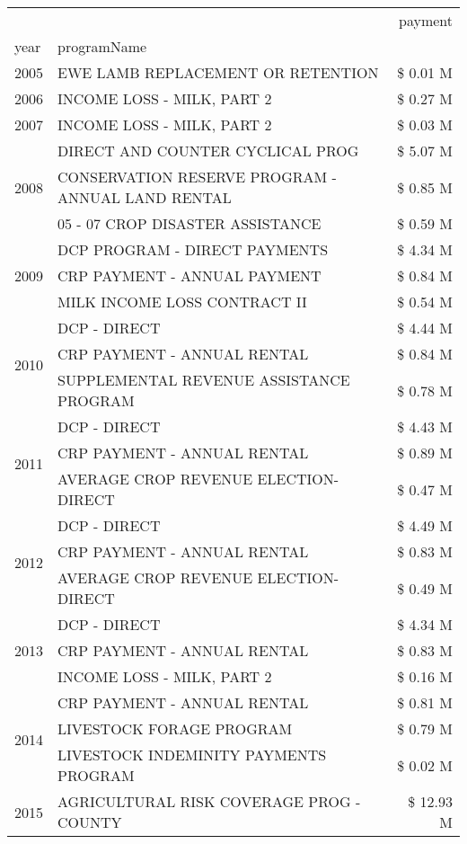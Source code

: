 \begin{tabular}{llr}
\toprule
 &  & payment \\
year & programName &  \\
\midrule
2005 & EWE LAMB REPLACEMENT OR RETENTION & \$ 0.01 M \\
\cline{1-3}
2006 & INCOME LOSS - MILK, PART 2 & \$ 0.27 M \\
\cline{1-3}
2007 & INCOME LOSS - MILK, PART 2 & \$ 0.03 M \\
\cline{1-3}
\multirow[t]{3}{*}{2008} & DIRECT AND COUNTER CYCLICAL PROG & \$ 5.07 M \\
 & CONSERVATION RESERVE PROGRAM - ANNUAL LAND RENTAL & \$ 0.85 M \\
 & 05 - 07 CROP DISASTER ASSISTANCE & \$ 0.59 M \\
\cline{1-3}
\multirow[t]{3}{*}{2009} & DCP PROGRAM - DIRECT PAYMENTS & \$ 4.34 M \\
 & CRP PAYMENT - ANNUAL PAYMENT & \$ 0.84 M \\
 & MILK INCOME LOSS CONTRACT II & \$ 0.54 M \\
\cline{1-3}
\multirow[t]{3}{*}{2010} & DCP - DIRECT & \$ 4.44 M \\
 & CRP PAYMENT - ANNUAL RENTAL & \$ 0.84 M \\
 & SUPPLEMENTAL REVENUE ASSISTANCE PROGRAM & \$ 0.78 M \\
\cline{1-3}
\multirow[t]{3}{*}{2011} & DCP - DIRECT & \$ 4.43 M \\
 & CRP PAYMENT - ANNUAL RENTAL & \$ 0.89 M \\
 & AVERAGE CROP REVENUE ELECTION-DIRECT & \$ 0.47 M \\
\cline{1-3}
\multirow[t]{3}{*}{2012} & DCP - DIRECT & \$ 4.49 M \\
 & CRP PAYMENT - ANNUAL RENTAL & \$ 0.83 M \\
 & AVERAGE CROP REVENUE ELECTION-DIRECT & \$ 0.49 M \\
\cline{1-3}
\multirow[t]{3}{*}{2013} & DCP - DIRECT & \$ 4.34 M \\
 & CRP PAYMENT - ANNUAL RENTAL & \$ 0.83 M \\
 & INCOME LOSS - MILK, PART 2 & \$ 0.16 M \\
\cline{1-3}
\multirow[t]{3}{*}{2014} & CRP PAYMENT - ANNUAL RENTAL & \$ 0.81 M \\
 & LIVESTOCK FORAGE PROGRAM & \$ 0.79 M \\
 & LIVESTOCK INDEMINITY PAYMENTS PROGRAM & \$ 0.02 M \\
\cline{1-3}
\multirow[t]{3}{*}{2015} & AGRICULTURAL RISK COVERAGE PROG - COUNTY & \$ 12.93 M \\

\end{tabular}
